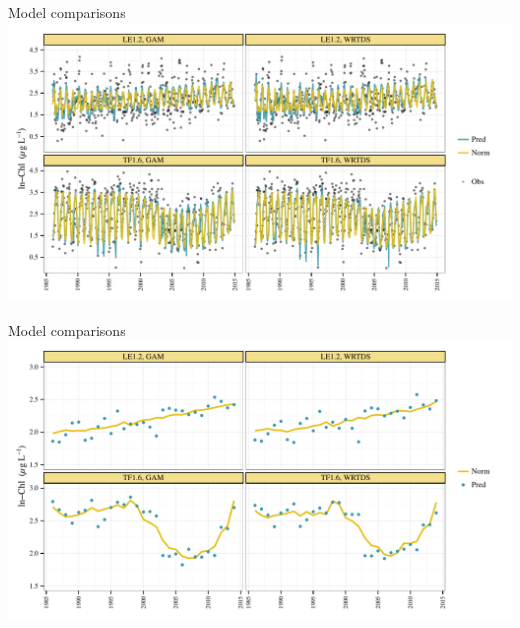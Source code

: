 \documentclass[serif]{beamer}\usepackage[]{graphicx}\usepackage[]{color}
\begin{document}
\begin{frame}{Model comparisons}
\includegraphics[width=\textwidth]{figs/predmo.pdf}
\end{frame}

\begin{frame}{Model comparisons}
\includegraphics[width=\textwidth]{figs/predann.pdf}
\end{frame}
\end{document}
